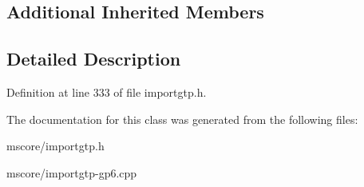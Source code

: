 \subsection*{Additional Inherited Members}


\subsection{Detailed Description}


Definition at line 333 of file importgtp.\+h.



The documentation for this class was generated from the following files\+:\begin{DoxyCompactItemize}
\item 
mscore/importgtp.\+h\item 
mscore/importgtp-\/gp6.\+cpp\end{DoxyCompactItemize}
